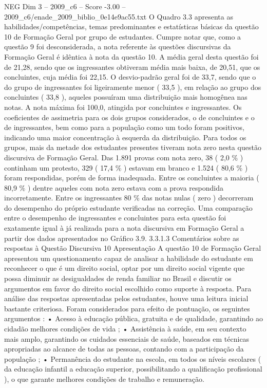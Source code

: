 \begin{textsample}{NEG Dim 3 – 2009\_c6 – Score -3.00 – 2009\_c6/enade\_2009\_biblio\_0e14e9ac55.txt}
O Quadro 3.3 apresenta as habilidades/competências, temas predominantes e estatísticas básicas da questão 10 de Formação Geral por grupo de estudantes.
Cumpre notar que, como a questão 9 foi desconsiderada, a nota referente às questões discursivas da Formação Geral é idêntica à nota da questão 10.
A média geral desta questão foi de 21,28, sendo que os ingressantes obtiveram média mais baixa, de 20,51, que os concluintes, cuja média foi 22,15.
O desvio-padrão geral foi de 33,7, sendo que o do grupo de ingressantes foi ligeiramente menor ( 33,5 ), em relação ao grupo dos concluintes ( 33,8 ), aqueles possuíram uma distribuição mais homogênea nas notas.
A nota máxima foi 100,0, atingida por concluintes e ingressantes.
Os coeficientes de assimetria para os dois grupos considerados, o de concluintes e o de ingressantes, bem como para a população como um todo foram positivos, indicando uma maior concentração à esquerda da distribuição.
Para todos os grupos, mais da metade dos estudantes presentes tiveram nota zero nesta questão discursiva de Formação Geral.
Das 1.891 provas com nota zero, 38 ( 2,0 \% ) continham um protesto, 329 ( 17,4 \% ) estavam em branco e 1.524 ( 80,6 \% ) foram respondidas, porém de forma inadequada.
Entre os concluintes a maioria ( 80,9 \% ) dentre aqueles com nota zero estava com a prova respondida incorretamente.
Entre os ingressantes 80 \% das notas nulas ( zero ) decorreram do desempenho do próprio estudante verificadas na correção.
Uma comparação entre o desempenho de ingressantes e concluintes para esta questão foi exatamente igual à já realizada para a nota discursiva em Formação Geral a partir dos dados apresentados no Gráfico 3.9. 3.3.1.3 Comentários sobre as respostas à Questão Discursiva 10 Apresentação A questão 10 de Formação Geral apresentou um questionamento capaz de analisar a habilidade do estudante em reconhecer o que é um direito social, optar por um direito social vigente que possa diminuir as desigualdades de renda familiar no Brasil e discutir os argumentos em favor do direito social escolhido como suporte à resposta.
Para análise das respostas apresentadas pelos estudantes, houve uma leitura inicial bastante criteriosa.
Foram considerados para efeito de pontuação, os seguintes argumentos : • Acesso à educação pública, gratuita e de qualidade, garantindo ao cidadão melhores condições de vida ; • Assistência à saúde, em seu contexto mais amplo, garantindo os cuidados essenciais de saúde, baseados em técnicas apropriadas ao alcance de todas as pessoas, contando com a participação da população ; • Permanência do estudante na escola, em todos os níveis escolares ( da educação infantil a educação superior, possibilitando a qualificação profissional ), o que garante melhores condições de trabalho e remuneração.

\end{textsample}
